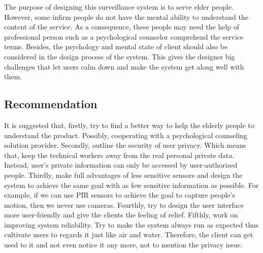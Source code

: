 \documentclass[11pt, a4paper]{article}
\begin{document}
The purpose of designing this surveillance system is to serve elder people. However, some infirm people do not have the mental ability to understand the content of the service. As a consequence, these people may need the help of professional person such as a psychological counselor comprehend the service terms. Besides, the psychology and mental state of client should also be considered in the design process of the system. This gives the designer big challenges that let users calm down and make the system get along well with them.





\subsection{Recommendation}


It is suggested that, firstly, try to find a better way to help the elderly people to understand the product. Possibly, cooperating with a psychological counseling solution provider. Secondly, outline the security of user privacy. Which means that, keep the technical workers away from the real personal private data. Instead, user's private information can only be accessed by user-authorised people. Thirdly, make full advantages of less sensitive sensors and design the system to achieve the same goal with as few sensitive information as possible. For example, if we can use PIR sensors to achieve the goal to capture people's motion, then we never use cameras. Fourthly, try to design the user interface more user-friendly and give the clients the feeling of relief. Fifthly, work on improving system reliability. Try to make the system always run as expected thus cultivate users to regards it just like air and water. Therefore, the client can get used to it and not even notice it any more, not to mention the privacy issue.




\newpage
\end{document}
